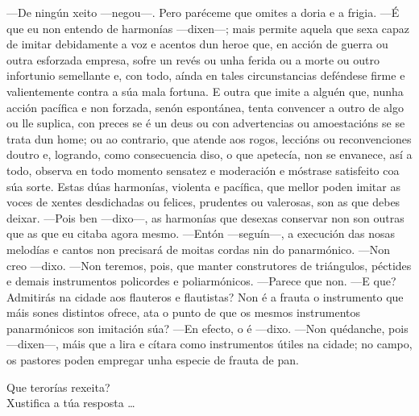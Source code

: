 \begin{multicols}{3}
{\noindent
---De ningún xeito ---negou---. Pero paréceme que omites a doria e a frigia.
\noindent
---É que eu non entendo de harmonías ---dixen---; mais permite aquela
que sexa capaz de imitar debidamente a voz e acentos dun heroe que, en
acción de guerra ou outra esforzada empresa, sofre un revés ou unha
ferida ou a morte ou outro infortunio semellante e, con todo, aínda en
tales circunstancias deféndese firme e valientemente contra a súa mala
fortuna. E outra que imite a alguén que, nunha acción pacífica e non
forzada, senón espontánea, tenta convencer a outro de algo ou lle
suplica, con preces se é un deus ou con advertencias ou amoestacións se
se trata dun home; ou ao contrario, que atende aos rogos, leccións ou
reconvenciones doutro e, logrando, como consecuencia diso, o que
apetecía, non se envanece, así a todo, observa en todo momento sensatez
e moderación e móstrase satisfeito coa súa sorte. Estas dúas harmonías,
violenta e pacífica, que mellor poden imitar as voces de xentes
desdichadas ou felices, prudentes ou valerosas, son as que debes deixar.
\noindent
---Pois ben ---dixo---, as harmonías que desexas conservar non son
outras que as que eu citaba agora mesmo.
\noindent
---Entón ---seguín---, a execución das nosas melodías e cantos non
precisará de moitas cordas nin do panarmónico.
\noindent
---Non creo ---dixo.
\noindent
---Non teremos, pois, que manter construtores de triángulos, péctides e
demais instrumentos policordes e poliarmónicos.
\noindent
---Parece que non.
\noindent
---E que? Admitirás na cidade aos flauteros e flautistas? Non é a frauta
o instrumento que máis sones distintos ofrece, ata o punto de que os
mesmos instrumentos panarmónicos son imitación súa?
\noindent
---En efecto, o é ---dixo.
\noindent
---Non quédanche, pois ---dixen---, máis que a lira e cítara como
instrumentos útiles na cidade; no campo, os pastores poden empregar unha
especie de frauta de pan.
\noindent
}
\end{multicols}


\begin{ejercicio}[]
Que terorías rexeita?\dotfill \\
Xustifica a túa resposta \ldots
 \vspace*{2.0cm} %
\end{ejercicio}
%

